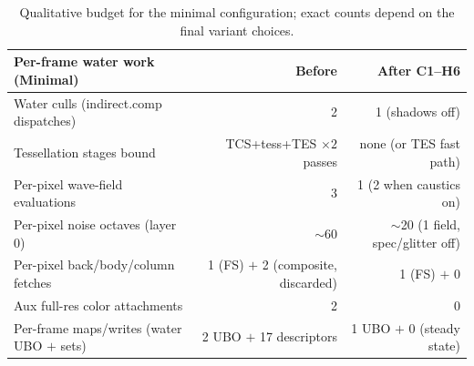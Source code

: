 \documentclass[11pt,a4paper]{article}
\begin{document}
\begin{table}[h]
\centering
\small
\begin{tabular}{@{}lrr@{}}
\toprule
\textbf{Per-frame water work (Minimal)} & \textbf{Before} & \textbf{After C1--H6} \\
\midrule
Water culls (indirect.comp dispatches) & 2 & 1 (shadows off) \\
Tessellation stages bound & TCS+tess+TES $\times 2$ passes & none (or TES fast path) \\
Per-pixel wave-field evaluations & 3 & 1 (2 when caustics on) \\
Per-pixel noise octaves (layer 0) & $\sim$60 & $\sim$20 (1 field, spec/glitter off) \\
Per-pixel back/body/column fetches & 1 (FS) $+$ 2 (composite, discarded) & 1 (FS) $+$ 0 \\
Aux full-res color attachments & 2 & 0 \\
Per-frame maps/writes (water UBO $+$ sets) & 2 UBO $+$ 17 descriptors & 1 UBO $+$ 0 (steady state) \\
\bottomrule
\end{tabular}
\caption{Qualitative budget for the minimal configuration; exact counts depend on the final variant choices.}
\end{table}
\end{document}
